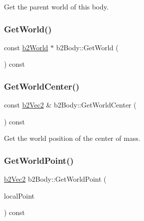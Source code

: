 Get the parent world of this body. 

\mbox{\label{classb2_body_a7e0fc2b91fbfc11da467700fd0792088}} 
\subsubsection{\texorpdfstring{GetWorld()}{GetWorld()}\hspace{0.1cm}{\footnotesize\ttfamily [2/2]}}
{\footnotesize\ttfamily const \mbox{\hyperlink{classb2_world}{b2\+World}} $\ast$ b2\+Body\+::\+Get\+World (\begin{DoxyParamCaption}{ }\end{DoxyParamCaption}) const\hspace{0.3cm}{\ttfamily [inline]}}

\mbox{\label{classb2_body_a3e14cfe61c63913ef7b0f719f7145318}} 
\subsubsection{\texorpdfstring{GetWorldCenter()}{GetWorldCenter()}}
{\footnotesize\ttfamily const \mbox{\hyperlink{structb2_vec2}{b2\+Vec2}} \& b2\+Body\+::\+Get\+World\+Center (\begin{DoxyParamCaption}{ }\end{DoxyParamCaption}) const\hspace{0.3cm}{\ttfamily [inline]}}



Get the world position of the center of mass. 

\mbox{\label{classb2_body_a712b782c61963c6f07beca86acc631ae}} 
\subsubsection{\texorpdfstring{GetWorldPoint()}{GetWorldPoint()}}
{\footnotesize\ttfamily \mbox{\hyperlink{structb2_vec2}{b2\+Vec2}} b2\+Body\+::\+Get\+World\+Point (\begin{DoxyParamCaption}\item[{const \mbox{\hyperlink{structb2_vec2}{b2\+Vec2}} \&}]{local\+Point }\end{DoxyParamCaption}) const\hspace{0.3cm}{\ttfamily [inline]}}

